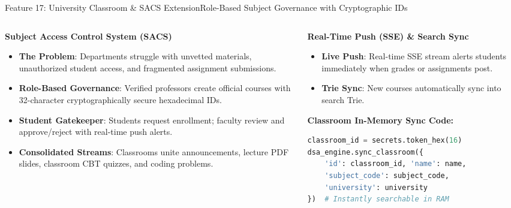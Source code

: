 \documentclass[aspectratio=169,10pt]{beamer}
\begin{document}
\begin{frame}[fragile,t]{Feature 17: University Classroom \& SACS Extension}{Role-Based Subject Governance with Cryptographic IDs}
  \begin{columns}[t]
    \begin{column}{0.48\textwidth}
      {\fontsize{9.0}{11.0}\selectfont\textbf{\textcolor{KoinexaRed}{Subject Access Control System (SACS)}}}\par\vspace{1.5pt}
      \begin{itemize}\setlength{\itemsep}{1.5pt}
        \item {\fontsize{8.0}{9.8}\selectfont \textbf{The Problem}: Departments struggle with unvetted materials, unauthorized student access, and fragmented assignment submissions.}
        \item {\fontsize{8.0}{9.8}\selectfont \textbf{Role-Based Governance}: Verified professors create official courses with 32-character cryptographically secure hexadecimal IDs.}
        \item {\fontsize{8.0}{9.8}\selectfont \textbf{Student Gatekeeper}: Students request enrollment; faculty review and approve/reject with real-time push alerts.}
        \item {\fontsize{8.0}{9.8}\selectfont \textbf{Consolidated Streams}: Classrooms unite announcements, lecture PDF slides, classroom CBT quizzes, and coding problems.}
      \end{itemize}
    \end{column}
    \begin{column}{0.48\textwidth}
      {\fontsize{9.0}{11.0}\selectfont\textbf{\textcolor{KoinexaOrange}{Real-Time Push (SSE) \& Search Sync}}}\par\vspace{1.5pt}
      \begin{itemize}\setlength{\itemsep}{1.2pt}
        \item {\fontsize{8.0}{9.8}\selectfont \textbf{Live Push}: Real-time SSE stream alerts students immediately when grades or assignments post.}
        \item {\fontsize{8.0}{9.8}\selectfont \textbf{Trie Sync}: New courses automatically sync into search Trie.}
      \end{itemize}
      \vspace{0.1cm}
      {\fontsize{8.0}{10.0}\selectfont\textbf{\textcolor{KoinexaRed}{Classroom In-Memory Sync Code:}}}
\begin{lstlisting}[language=Python]
classroom_id = secrets.token_hex(16)
dsa_engine.sync_classroom({
    'id': classroom_id, 'name': name,
    'subject_code': subject_code,
    'university': university
})  # Instantly searchable in RAM
\end{lstlisting}
    \end{column}
  \end{columns}
\end{frame}
\end{document}
